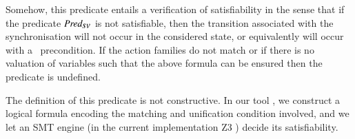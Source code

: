 \documentclass{elsarticle}
\begin{document}
Somehow, this predicate entails a verification of satisfiability in the sense that if the 
predicate $\Predsv$ is not satisfiable, then the transition associated with the 
synchronisation will not occur in the considered state, or equivalently will occur with a \False\ precondition.
If the action families do not match or if there is no valuation of
variables such that the above formula can be ensured then the predicate is undefined.


The definition of this predicate is not constructive. In our tool \cite{qin:hal-01823507}, we construct a logical formula encoding the matching 
and unification condition involved, and we let an SMT engine (in the current implementation Z3 \cite{Johnson:2014:qosa}) decide its satisfiability.
\end{document}
